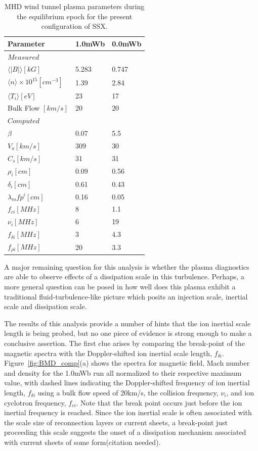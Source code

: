 \documentclass[aip,prl,amsmath,amssymb,reprint,superscriptaddress]{revtex4-1} %
\begin{document}
\begin{table}
\caption{\label{tab:params}MHD wind tunnel plasma parameters during the equilibrium epoch for the present configuration of SSX.}
\begin{tabular}{|l|l|l|}
\hline
Parameter&1.0mWb&0.0mWb\\
\hline
$Measured$&&\\
\hline
$\langle |B|\rangle [kG]$&5.283&0.747\\
$\langle n\rangle \times 10^{15} [cm^{-3}]$&1.39&2.84\\
$\langle T_{i}\rangle [eV]$&23&17\\
Bulk Flow $[km/s]$&20&20\\
\hline
$Computed$&&\\
\hline
$\beta$&0.07&5.5\\
$V_{a} [km/s]$&309&30\\
$C_{s} [km/s]$&31&31\\
$\rho_{i} [cm]$&0.09&0.56\\
$\delta_{i} [cm]$&0.61&0.43\\
$\lambda_mfp^{i} [cm]$&0.16&0.05\\
$f_{ci} [MHz]$&8&1.1\\
$\nu_{i} [MHz]$&6&19\\
$f_{\delta i} [MHz]$&3&4.3\\
$f_{\rho i} [MHz]$&20&3.3\\
\hline
\end{tabular}
\end{table}

A major remaining question for this analysis is whether the plasma diagnostics are able to observe effects of a dissipation scale in this turbulence. Perhaps, a more general question can be posed in how well does this plasma exhibit a traditional fluid-turbulence-like picture which posits an injection scale, inertial scale and dissipation scale.

The results of this analysis provide a number of hints that the ion inertial scale length is being probed, but no one piece of evidence is strong enough to make a conclusive assertion. The first clue arises by comparing the break-point of the magnetic spectra with the Doppler-shifted ion inertial scale length, $f_{\delta i}$. Figure~\ref{fig:BMD_comp}(a) shows the spectra for magnetic field, Mach number and density for the 1.0mWb run all normalized to their respective maximum value, with dashed lines indicating the Doppler-shifted frequency of ion inertial length, $f_{\delta i}$ using a bulk flow speed of 20km/s, the collision frequency, $\nu_{i}$, and ion cyclotron frequency, $f_{ci}$. Note that the break point occurs just before the ion inertial frequency is reached. Since the ion inertial scale is often associated with the scale size of reconnection layers or current sheets, a break-point just proceeding this scale suggests the onset of a dissipation mechanism associated with current sheets of some form(citation needed).
\end{document}
